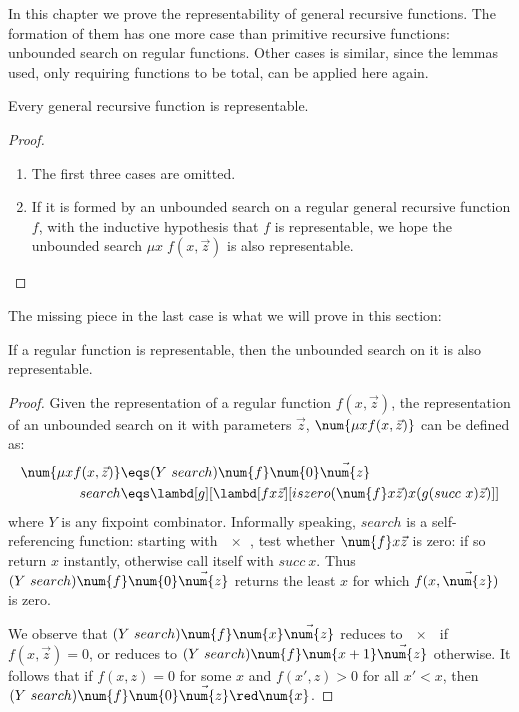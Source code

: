 \documentclass[../../../include/open-logic-section]{subfiles}
\begin{document}

In this chapter we prove the representability of general recursive
functions. The formation of them has one more case than primitive
recursive functions: unbounded search on regular functions. Other
cases is similar, since the lemmas used, only requiring functions to be
total, can be applied here again. 
\begin{prop}
  Every general recursive function is representable.
\end{prop}
\begin{proof}
  \begin{enumerate}
  \item The first three cases are omitted.
  \item If it is formed by an unbounded search on a regular general
    recursive function $f$, with the inductive hypothesis that $f$ is representable,
    we hope the unbounded search $\mu x \; f(x, \vec z)$ is also
    representable. 
  \end{enumerate}
\end{proof}

The missing piece in the last case is what we will prove in this
section:

\begin{lem}
  If a regular function is representable, then the unbounded search on
  it is also representable.
\end{lem}
\begin{proof}
  Given the representation of a regular function $f(x,\vec z)$, the
  representation of an unbounded search on it with parameters $\vec
  z$, $\num{\mu x  f(x,\vec z)}$ can be defined as:
  \begin{align*}
    \num{\mu x  f(x,\vec{z})} &\eqs (Y ~ search) \num{f} \num{0}
                                 \vec{\num{z}} \\
    search &\eqs \lambd[g][\lambd[fx \vec{z}][iszero (\num{f} x \vec{z}) x (g (succ ~ x)
             \vec{z})]]
  \end{align*}
  where $Y$ is any fixpoint combinator. Informally speaking, $search$ is
  a self-referencing function: starting with $\num{x}$, test whether $\num{f} x
  \vec z$ is zero: if so return $x$ instantly, otherwise call itself
  with $succ ~ x$. Thus $(Y ~ search) \num{f} \num{0} \vec{\num{z}}$ returns
  the least $x$ for which $f(x,\vec{\num{z}})$ is zero.
  
  We observe that $(Y ~ search) \num{f} \num{x} \vec{\num{z}}$ reduces to $\num{x}$ if
  $f(x,\vec z)=0$, or reduces to $(Y ~ search) \num{f} \num{x+1} \vec{\num{z}}$
  otherwise. It follows that if $f(x,z) = 0$ for some $x$ and $f(x',z) > 0$ for all $x' < x$,
  then $(Y ~ search) \num{f} \num{0} \vec{\num{z}} \red \num{x}$.
\end{proof}
\end{document}
